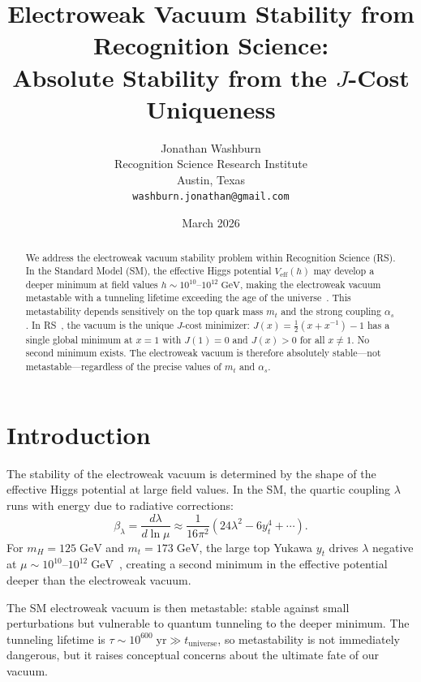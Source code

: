 \documentclass[12pt,a4paper]{article}
\title{Electroweak Vacuum Stability from Recognition Science:\\
Absolute Stability from the $J$-Cost Uniqueness}
\author{Jonathan Washburn\\
Recognition Science Research Institute\\
Austin, Texas\\
\texttt{washburn.jonathan@gmail.com}}
\date{March 2026}
\theoremstyle{definition}
\theoremstyle{remark}
\begin{document}
\maketitle

\begin{abstract}
We address the electroweak vacuum stability problem within
Recognition Science (RS).  In the Standard Model (SM), the effective
Higgs potential $V_{\mathrm{eff}}(h)$ may develop a deeper minimum at
field values $h \sim 10^{10}$--$10^{12}\;\mathrm{GeV}$, making the
electroweak vacuum metastable with a tunneling lifetime exceeding the
age of the universe~\cite{Degrassi2012, Buttazzo2013}.  This
metastability depends sensitively on the top quark mass $m_t$ and the
strong coupling $\alpha_s$.  In RS~\cite{RS_Axioms}, the vacuum is the unique
$J$-cost minimizer: $J(x) = \tfrac{1}{2}(x + x^{-1}) - 1$ has a
single global minimum at $x = 1$ with $J(1) = 0$ and $J(x) > 0$
for all $x \neq 1$.  No second minimum exists.  The electroweak
vacuum is therefore absolutely stable---not metastable---regardless
of the precise values of $m_t$ and $\alpha_s$.
\end{abstract}

\section{Introduction}
\label{sec:intro}

The stability of the electroweak vacuum is determined by the shape
of the effective Higgs potential at large field values.  In the SM,
the quartic coupling $\lambda$ runs with energy due to radiative
corrections:
\begin{equation}
  \beta_\lambda = \frac{d\lambda}{d\ln\mu}
  \approx \frac{1}{16\pi^2}\!\left(24\lambda^2 - 6y_t^4
  + \cdots\right).
\end{equation}
For $m_H = 125\;\mathrm{GeV}$ and $m_t = 173\;\mathrm{GeV}$, the
large top Yukawa $y_t$ drives $\lambda$ negative at
$\mu \sim 10^{10}$--$10^{12}\;\mathrm{GeV}$~\cite{Degrassi2012},
creating a second minimum in the effective potential deeper than the
electroweak vacuum.

The SM electroweak vacuum is then metastable: stable against small
perturbations but vulnerable to quantum tunneling to the deeper
minimum.  The tunneling lifetime is $\tau \sim 10^{600}\;\mathrm{yr}
\gg t_{\mathrm{universe}}$, so metastability is not immediately
dangerous, but it raises conceptual concerns about the ultimate fate
of our vacuum.
\end{document}
